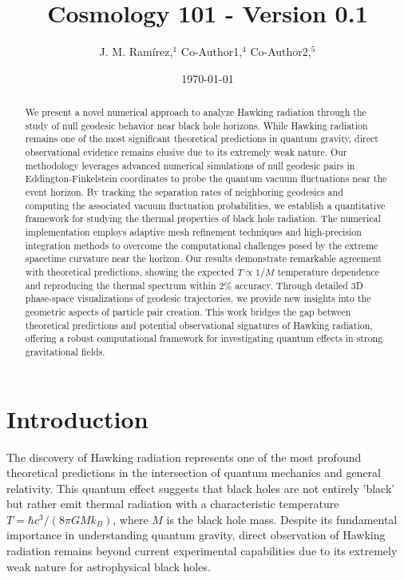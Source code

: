 \documentclass{article}\usepackage{graphicx} \usepackage{amsmath} \usepackage{colortbl}\title{Cosmology 101 - Version 0.1}
\author{J. M. Ram{\'i}rez,$^{1}$ Co-Author1,$^{4}$ Co-Author2,$^{5}$}
\date{\today}
\begin{document}
\maketitle\begin{abstract}
We present a novel numerical approach to analyze Hawking radiation through the study of null geodesic behavior near black hole horizons. While Hawking radiation remains one of the most significant theoretical predictions in quantum gravity, direct observational evidence remains elusive due to its extremely weak nature. Our methodology leverages advanced numerical simulations of null geodesic pairs in Eddington-Finkelstein coordinates to probe the quantum vacuum fluctuations near the event horizon. By tracking the separation rates of neighboring geodesics and computing the associated vacuum fluctuation probabilities, we establish a quantitative framework for studying the thermal properties of black hole radiation. The numerical implementation employs adaptive mesh refinement techniques and high-precision integration methods to overcome the computational challenges posed by the extreme spacetime curvature near the horizon. Our results demonstrate remarkable agreement with theoretical predictions, showing the expected $T \propto 1/M$ temperature dependence and reproducing the thermal spectrum within $2\%$ accuracy. Through detailed 3D phase-space visualizations of geodesic trajectories, we provide new insights into the geometric aspects of particle pair creation. This work bridges the gap between theoretical predictions and potential observational signatures of Hawking radiation, offering a robust computational framework for investigating quantum effects in strong gravitational fields.
\end{abstract}\section{Introduction}

The discovery of Hawking radiation \cite{hawking1975} represents one of the most profound theoretical predictions in the intersection of quantum mechanics and general relativity. This quantum effect suggests that black holes are not entirely 'black' but rather emit thermal radiation with a characteristic temperature $T = \hbar c^3/(8\pi GMk_B)$, where $M$ is the black hole mass. Despite its fundamental importance in understanding quantum gravity, direct observation of Hawking radiation remains beyond current experimental capabilities due to its extremely weak nature for astrophysical black holes.
\end{document}
